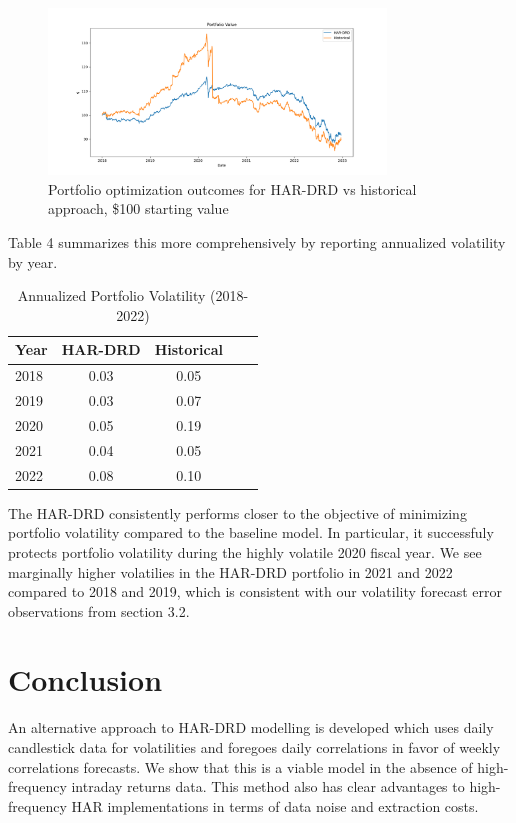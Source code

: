 \documentclass{article}
\begin{document}
\begin{figure}[ht]
    \centering
    \includegraphics[width=0.8\textwidth]{"Figures/Portfolio_Value.png"} 
    \captionsetup{width=0.7\textwidth,justification=centering}
    \caption{Portfolio optimization outcomes for HAR-DRD vs historical approach, \$100 starting value}
\end{figure}

Table 4 summarizes this more comprehensively by reporting annualized volatility by year.  

\begin{table}[ht]
    \centering
    \caption{Annualized Portfolio Volatility (2018-2022)}
    \begin{tabular}{lcccc}
    \toprule
    \textbf{Year} & \textbf{HAR-DRD} & \textbf{Historical}  \\
    \midrule
    2018 & 0.03 & 0.05 \\
    2019 & 0.03 & 0.07 \\
    2020 & 0.05 & 0.19 \\
    2021 & 0.04 & 0.05 \\
    2022 & 0.08 & 0.10 \\
    \bottomrule
    \end{tabular}
\end{table}

The HAR-DRD consistently performs closer to the objective of minimizing portfolio
volatility compared to the baseline model. In particular, it successfuly protects 
portfolio volatility during the highly volatile 2020 fiscal year. We see marginally
higher volatilies in the HAR-DRD portfolio in 2021 and 2022 compared to 2018 and 2019, which is consistent with
our volatility forecast error observations from section 3.2. 


\section{Conclusion}

An alternative approach to HAR-DRD modelling is developed which uses daily candlestick data for volatilities
and foregoes daily correlations in favor of weekly correlations forecasts. We show that this is a viable model in the absence of high-frequency
intraday returns data. This method also has clear advantages to high-frequency
HAR implementations in terms of data noise and extraction costs.
\end{document}
